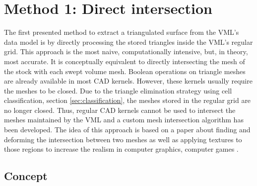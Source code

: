 
\chapter{Method 1: Direct intersection}
\label{ch:direct_intersection}

The first presented method to extract a triangulated surface from the VML's data model is by directly processing the stored triangles inside the VML's regular grid.
This approach is the most naive, computationally intensive, but, in theory, most accurate.
It is conceptually equivalent to directly intersecting the mesh of the stock with each swept volume mesh.
Boolean operations on triangle meshes are already available in most CAD kernels.
However, these kernels usually require the meshes to be closed.
Due to the triangle elimination strategy using cell classification, \cf section \ref{sec:classification}, the meshes stored in the regular grid are no longer closed.
Thus, regular CAD kernels cannot be used to intersect the meshes maintained by the VML and a custom mesh intersection algorithm has been developed.
The idea of this approach is based on a paper about finding and deforming the intersection between two meshes as well as applying textures to those regions to increase the realism in computer graphics, \ie computer games \cite{mesh_intersection}.

\section{Concept}
\label{sec:direct_intersection_concept}

